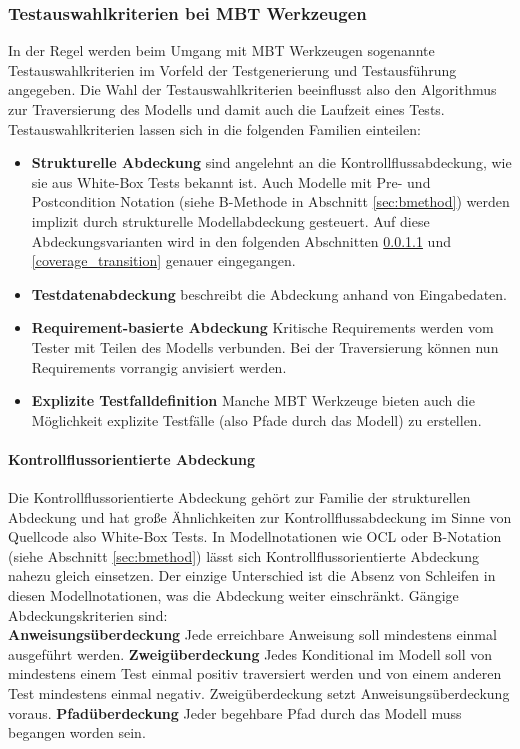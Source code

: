 \subsubsection{Testauswahlkriterien bei MBT Werkzeugen}
In der Regel werden beim Umgang mit MBT Werkzeugen sogenannte Testauswahlkriterien im Vorfeld der Testgenerierung und Testausführung angegeben. Die Wahl der Testauswahlkriterien beeinflusst also den Algorithmus zur Traversierung des Modells und damit auch die Laufzeit eines Tests.\\
Testauswahlkriterien lassen sich in die folgenden Familien einteilen:

\begin{itemize}
\item \textbf{Strukturelle Abdeckung} sind angelehnt an die Kontrollflussabdeckung, wie sie aus White-Box Tests bekannt ist. Auch Modelle mit Pre- und Postcondition Notation (siehe B-Methode in Abschnitt \ref{sec:bmethod}) werden implizit durch strukturelle Modellabdeckung gesteuert. Auf diese Abdeckungsvarianten wird in den folgenden Abschnitten \ref{coverage_control}  und \ref{coverage_transition}  genauer eingegangen.
\item \textbf{Testdatenabdeckung} beschreibt die Abdeckung anhand von Eingabedaten.
\item \textbf{Requirement-basierte Abdeckung} Kritische Requirements werden vom Tester mit Teilen des Modells verbunden. Bei der Traversierung können nun Requirements vorrangig anvisiert werden.
\item \textbf{Explizite Testfalldefinition} Manche MBT Werkzeuge bieten auch die Möglichkeit explizite Testfälle (also Pfade durch das Modell) zu erstellen.
\end{itemize}

\paragraph{Kontrollflussorientierte Abdeckung}\label{coverage_control} 
Die Kontrollflussorientierte Abdeckung gehört zur Familie der strukturellen Abdeckung und hat große Ähnlichkeiten zur Kontrollflussabdeckung im Sinne von Quellcode also White-Box Tests. In Modellnotationen wie OCL oder B-Notation (siehe Abschnitt \ref{sec:bmethod}) lässt sich Kontrollflussorientierte Abdeckung nahezu gleich einsetzen. Der einzige Unterschied ist die Absenz von Schleifen in diesen Modellnotationen, was die Abdeckung weiter einschränkt. Gängige Abdeckungskriterien sind:\cite{rossner_basiswissen_2010}\\
\textbf{Anweisungsüberdeckung} Jede erreichbare Anweisung soll mindestens einmal ausgeführt werden.
\textbf{Zweigüberdeckung} Jedes Konditional im Modell soll von mindestens einem Test einmal positiv traversiert werden und von einem anderen Test mindestens einmal negativ. Zweigüberdeckung setzt Anweisungsüberdeckung voraus.
\textbf{Pfadüberdeckung} Jeder begehbare Pfad durch das Modell muss begangen worden sein.

